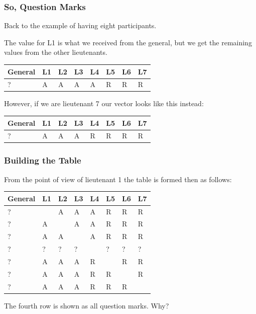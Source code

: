 \begin{frame}
	\frametitle{So, Question Marks}

	Back to the example of having eight participants.

	The value for L1 is what we received from the general, but we get the remaining values from the other lieutenants.

	\begin{center}
		\begin{tabular}{|l|l|l|l|l|l|l|l|}
			\hline
			General & L1 & L2 & L3 & L4 & L5 & L6 & L7 \\
			\hline
			?       & A  & A  & A  & A  & R  & R  & R  \\
			\hline
		\end{tabular}
	\end{center}

	However, if we are lieutenant 7 our vector looks like this instead:

	\begin{center}
		\begin{tabular}{|l|l|l|l|l|l|l|l|}
			\hline
			General & L1 & L2 & L3 & L4 & L5 & L6 & L7 \\
			\hline
			?       & A  & A  & A  & R  & R  & R  & R  \\
			\hline
		\end{tabular}
	\end{center}

\end{frame}

\begin{frame}
	\frametitle{Building the Table}

	From the point of view of lieutenant 1 the table is formed then as follows:

	\begin{center}
		\begin{tabular}{|l|l|l|l|l|l|l|l|}
			\hline
			General & L1 & L2 & L3 & L4 & L5 & L6 & L7 \\
			\hline
			?       & ~  & A  & A  & A  & R  & R  & R  \\ \hline
			?       & A  & ~  & A  & A  & R  & R  & R  \\ \hline
			?       & A  & A  & ~  & A  & R  & R  & R  \\ \hline
			?       & ?  & ?  & ?  & ~  & ?  & ?  & ?  \\ \hline
			?       & A  & A  & A  & R  & ~  & R  & R  \\ \hline
			?       & A  & A  & A  & R  & R  & ~  & R  \\ \hline
			?       & A  & A  & A  & R  & R  & R  & ~  \\ \hline
		\end{tabular}
	\end{center}

	The fourth row is shown as all question marks. Why?

\end{frame}


